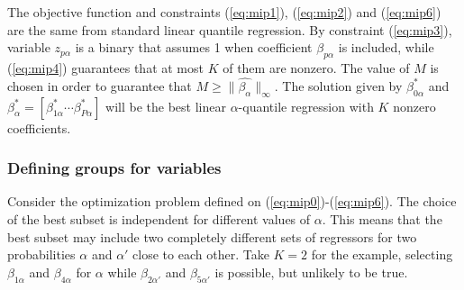 The objective function and constraints (\ref{eq:mip1}), (\ref{eq:mip2}) and (\ref{eq:mip6}) are the same from standard linear quantile regression. 
By constraint (\ref{eq:mip3}), variable $z_{p \alpha}$ is a binary that assumes 1 when coefficient $\beta_{p \alpha}$ is included, while (\ref{eq:mip4}) guarantees that at most $K$ of them are nonzero.
The value of $M$ is chosen in order to guarantee that $M \geq \|\hat{\beta_\alpha}\|_{\infty}$. The solution given by $\beta_{0\alpha}^*$ and $\beta_\alpha^* = [ \beta_{1 \alpha}^* \cdots \beta_{P\alpha}^* ]$ will be the best linear $\alpha$-quantile regression with $K$ nonzero coefficients.  

\subsubsection*{Defining groups for variables}

Consider the optimization problem defined on (\ref{eq:mip0})-(\ref{eq:mip6}). The choice of the best subset is independent for different values of $\alpha$. This means that the best subset may include two completely different sets of regressors for two probabilities $\alpha$ and $\alpha'$ close to each other. Take $K=2$ for the example, selecting $\beta_{1\alpha}$ and $\beta_{4\alpha}$ for $\alpha$ while $\beta_{2\alpha'}$ and $\beta_{5\alpha'}$ is possible, but unlikely to be true.  

